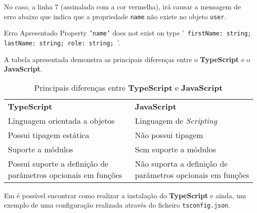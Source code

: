 No caso, a linha 7 (assinalada com a cor vermelha), irá causar a mensagem de erro abaixo que indica que a propriedade \texttt{name} não existe no objeto \texttt{user}.

\begin{errorbox}{Erro Apresentado}
	Property \texttt{'name'} does not exist on type '\texttt{{ firstName: string; lastName: string; role: string; }}'.
\end{errorbox}

A tabela apresentada demonstra as principais diferenças entre o \textbf{TypeScript} e o \textbf{JavaScript}.

\begin{table}[h!]
	\renewcommand{\arraystretch}{1.25}
	\begin{tabularx}{\textwidth}{ |X|X| }
		\rowcolor{estg}	{\color[HTML]{FFFFFF} \textbf{TypeScript}} & {\color[HTML]{FFFFFF} \textbf{JavaScript}} \\
		Linguagem orientada a objetos & Linguagem de \textit{Scripting} \\\hline
		Possui tipagem estática & Não possui tipagem \\\hline
		Suporte a módulos & Sem suporte a módulos\\\hline
		Possui suporte a definição de parâmetros opcionais em funções & Não suporta a definição de parâmetros opcionais em funções \\\hline
	\end{tabularx}

	\caption{Principais diferenças entre \textbf{TypeScript} e \textbf{JavaScript}}
\end{table}

Em  é possível encontrar como realizar a instalação do \textbf{TypeScript} e ainda, um exemplo de uma configuração realizada através do ficheiro \texttt{tsconfig.json}.
